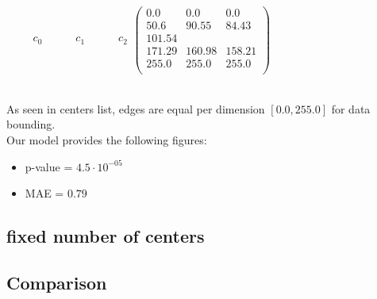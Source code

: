	$
	\begin{matrix}  \qquad  c_0 \quad  \qquad c_1 \quad  \qquad c_2 \end{matrix}
			
	
		\begin{pmatrix}
		0.0 &     0.0 &    0.0\\
		50.6 &   90.55 &    84.43 \\
		101.54 &    &   \\		
		171.29 &   160.98 &   158.21\\
		255.0 &  255.0 &   255.0 \\
		\end{pmatrix}$\\
$ $
	

	As seen in centers list, edges are equal per dimension $[0.0 , 255.0]$ for data bounding.\\
	
	Our model provides the following figures:	
	\begin{itemize}
	\item 	p-value = $4.5 \cdot 10 ^{-05}$
	\item 	MAE = $0.79$
	
	\end{itemize}



\subsection{fixed number of centers}



\subsection{Comparison}

